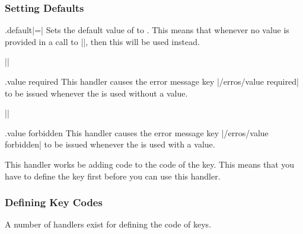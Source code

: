 \subsubsection{Setting Defaults}
\label{section-default-handlers}

\begin{handler}{{.default}|=|}
  Sets the default value of  to . This means
  that whenever no value is provided in a call to |\pgfkeys|, then
  this  will be used instead.

  \example ||
\end{handler}

\begin{handler}{{.value required}}
  This handler causes the error message key |/erros/value required| to
  be issued whenever the  is used without a value.

  \example ||
\end{handler}

\begin{handler}{{.value forbidden}}
  This handler causes the error message key |/erros/value forbidden|
  to be issued whenever the  is used with a value.

  This handler works be adding code to the code of the key. This means
  that you have to define the key first before you can use this
  handler. 
\begin{codeexample}

\end{codeexample}
\end{handler}


\subsubsection{Defining Key Codes}
\label{section-code-handlers}

A number of handlers exist for defining the code of keys.

